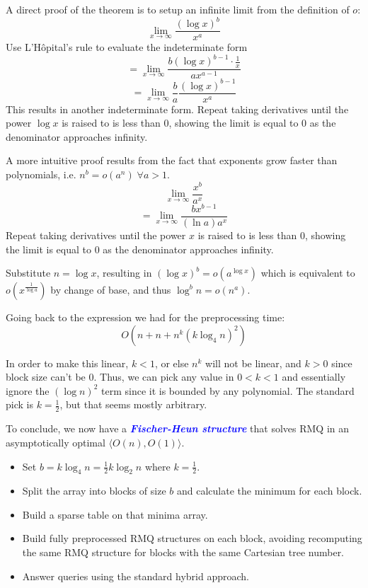 \documentclass[11pt, oneside]{article}
\newcommand{\emphasis}[1]{\textcolor{blue}{\textbf{\textit{#1}}}}
\begin{document}
A direct proof of the theorem is to setup an infinite limit from the definition of \( o \):
\[ \lim_{x \to \infty} \frac{(\log x)^{b}}{x^a} \]
Use L'Hôpital's rule to evaluate the indeterminate form
\[ = \lim_{x \to \infty} \frac{b (\log x)^{b - 1} \cdot \frac{1}{x}}{a x^{a - 1}} \]
\[ = \lim_{x \to \infty} \frac{b}{a} \frac{(\log x)^{b - 1}}{x^a} \]
This results in another indeterminate form. Repeat taking derivatives until the power \( \log x \) is raised to
is less than 0, showing the limit is equal to 0 as the denominator approaches infinity.

A more intuitive proof results from the fact that exponents grow faster than polynomials,
i.e. \( n^b = o(a^n) \; \forall a > 1\).
\[ \lim_{x \to \infty} \frac{x^b}{a^x} \]
\[ = \lim_{x \to \infty} \frac{bx^{b - 1}}{(\ln a) a^x} \]
Repeat taking derivatives until the power \( x \) is raised to is less than 0,
showing the limit is equal to 0 as the denominator approaches infinity.

Substitute \( n = \log x \), resulting in \( (\log x)^b = o(a^{\log x}) \)
which is equivalent to \( o(x^{\frac{1}{\log a}}) \) by change of base, and
thus \( \log^b n = o(n^a) \).

Going back to the expression we had for the preprocessing time:
\[ O(n + n + n^k (k \log_4 n)^2) \]

In order to make this linear, \( k < 1 \), or else \( n^k \) will not be linear,
and \( k > 0 \) since block size can't be 0. Thus, we can pick any value in
\( 0 < k < 1 \) and essentially ignore the \( (\log n)^2 \) term since it is bounded
by any polynomial. The standard pick is \( k = \frac{1}{2} \), but that seems mostly arbitrary.

To conclude, we now have a \emphasis{Fischer-Heun structure} that solves RMQ
in an asymptotically optimal \( \langle O(n), O(1) \rangle \).

\begin{itemize}
  \item Set \( b = k \log_4 n = \frac{1}{2} k \log_2 n \) where \( k = \frac{1}{2} \).
  \item Split the array into blocks of size \( b \) and calculate the minimum for each block.
  \item Build a sparse table on that minima array.
  \item Build fully preprocessed RMQ structures on each block, avoiding recomputing the
  same RMQ structure for blocks with the same Cartesian tree number.
  \item Answer queries using the standard hybrid approach.
\end{itemize}
\end{document}
